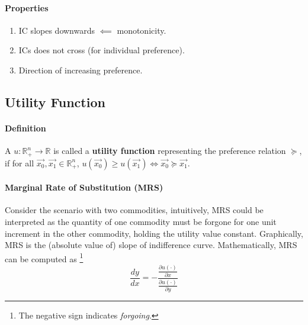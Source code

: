 \documentclass{article}
\begin{document}
\paragraph{Properties}
\begin{enumerate}
	\item IC slopes downwards $\impliedby$ monotonicity.
	\item ICs does not cross (for individual preference).
	\item Direction of increasing preference.
\end{enumerate}

\subsection{Utility Function}
\paragraph{Definition} A  $u: \mathbb{R}^n_{+} \to \mathbb{R}$ is called a \textbf{utility function} representing the preference relation $\succcurlyeq$, if for all $\vec{x_0}, \vec{x_1} \in \mathbb{R}^n_{+}$, $u(\vec{x_0}) \geq u(\vec{x_1}) \iff \vec{x_0} \succcurlyeq \vec{x_1}$.

\paragraph{Marginal Rate of Substitution (MRS)} Consider the scenario with two commodities, intuitively, MRS could be interpreted as the quantity of one commodity must be forgone for one unit increment in the other commodity, holding the utility value constant. Graphically, MRS is the (absolute value of) slope of indifference curve. Mathematically, MRS can be computed as \footnote{The negative sign indicates \emph{forgoing}.}
\[
	\frac{dy}{dx} = - \frac{\frac{\partial u(\cdot)}{\partial x}}{\frac{\partial u(\cdot)}{\partial y}}
\]
\end{document}
